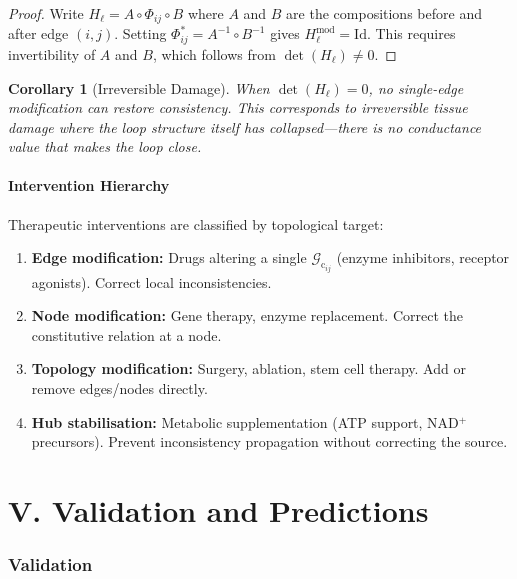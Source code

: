 \documentclass[10pt,twocolumn,a4paper]{article}
\theoremstyle{plain}
\newtheorem{corollary}[theorem]{Corollary}
\theoremstyle{definition}
\theoremstyle{remark}
\newcommand{\Gcond}{\mathcal{G}_{\mathrm{c}}}
\begin{document}
\begin{proof}
Write $H_\ell = A \circ \Phi_{ij} \circ B$ where $A$ and $B$ are the compositions before and after edge $(i,j)$. Setting $\Phi_{ij}^* = A^{-1} \circ B^{-1}$ gives $H_\ell^{\mathrm{mod}} = \mathrm{Id}$. This requires invertibility of $A$ and $B$, which follows from $\det(H_\ell) \neq 0$.
\end{proof}

\begin{corollary}[Irreversible Damage]
\label{cor:irreversible}
When $\det(H_\ell) = 0$, no single-edge modification can restore consistency. This corresponds to irreversible tissue damage where the loop structure itself has collapsed---there is no conductance value that makes the loop close.
\end{corollary}

\subsection{Intervention Hierarchy}

Therapeutic interventions are classified by topological target:
\begin{enumerate}[label=(\roman*)]
    \item \textbf{Edge modification:} Drugs altering a single $\Gcond_{ij}$ (enzyme inhibitors, receptor agonists). Correct local inconsistencies.
    \item \textbf{Node modification:} Gene therapy, enzyme replacement. Correct the constitutive relation at a node.
    \item \textbf{Topology modification:} Surgery, ablation, stem cell therapy. Add or remove edges/nodes directly.
    \item \textbf{Hub stabilisation:} Metabolic supplementation (ATP support, NAD$^+$ precursors). Prevent inconsistency propagation without correcting the source.
\end{enumerate}


\part*{V. Validation and Predictions}

\section{Validation}
\label{sec:validation}
\end{document}
